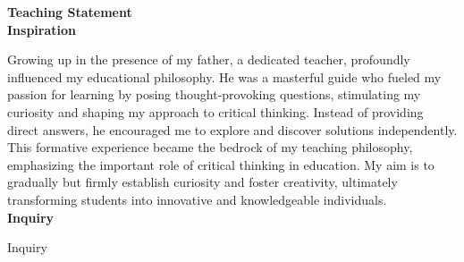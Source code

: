 {\bf Teaching Statement}
\vspace*{3\baselineskip}\\
{\bf Inspiration}

Growing up in the presence of my father, a dedicated teacher, profoundly influenced my educational philosophy. He was a masterful guide who fueled my passion for learning by posing thought-provoking questions, stimulating my curiosity and shaping my approach to critical thinking. Instead of providing direct answers, he encouraged me to explore and discover solutions independently. This formative experience became the bedrock of my teaching philosophy, emphasizing the important role of critical thinking in education. My aim is to gradually but firmly establish curiosity and foster creativity, ultimately transforming students into innovative and knowledgeable individuals.
 \\ [0.2cm]
{\bf Inquiry }

Inquiry

